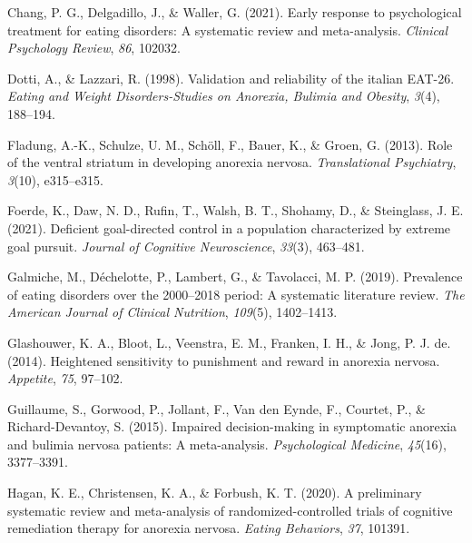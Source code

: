 \documentclass[
  man,floatsintext]{apa6}
\newlength{\cslhangindent}
\newlength{\cslentryspacingunit} %
\newenvironment{CSLReferences}[2] %
 {%
  \setlength{\parindent}{0pt}
  \ifodd #1
  \let\oldpar\par
  \def\par{\hangindent=\cslhangindent\oldpar}
  \fi
  \setlength{\parskip}{#2\cslentryspacingunit}
 }%
 {}
\begin{document}
\begin{CSLReferences}{1}{0}
\leavevmode{}%
Chang, P. G., Delgadillo, J., \& Waller, G. (2021). Early response to psychological treatment for eating disorders: A systematic review and meta-analysis. \emph{Clinical Psychology Review}, \emph{86}, 102032.

\leavevmode{}%
Dotti, A., \& Lazzari, R. (1998). Validation and reliability of the italian {EAT-26}. \emph{Eating and Weight Disorders-Studies on Anorexia, Bulimia and Obesity}, \emph{3}(4), 188--194.

\leavevmode{}%
Fladung, A.-K., Schulze, U. M., Schöll, F., Bauer, K., \& Groen, G. (2013). Role of the ventral striatum in developing anorexia nervosa. \emph{Translational Psychiatry}, \emph{3}(10), e315--e315.

\leavevmode{}%
Foerde, K., Daw, N. D., Rufin, T., Walsh, B. T., Shohamy, D., \& Steinglass, J. E. (2021). Deficient goal-directed control in a population characterized by extreme goal pursuit. \emph{Journal of Cognitive Neuroscience}, \emph{33}(3), 463--481.

\leavevmode{}%
Galmiche, M., Déchelotte, P., Lambert, G., \& Tavolacci, M. P. (2019). Prevalence of eating disorders over the 2000--2018 period: A systematic literature review. \emph{The American Journal of Clinical Nutrition}, \emph{109}(5), 1402--1413.

\leavevmode{}%
Glashouwer, K. A., Bloot, L., Veenstra, E. M., Franken, I. H., \& Jong, P. J. de. (2014). Heightened sensitivity to punishment and reward in anorexia nervosa. \emph{Appetite}, \emph{75}, 97--102.

\leavevmode{}%
Guillaume, S., Gorwood, P., Jollant, F., Van den Eynde, F., Courtet, P., \& Richard-Devantoy, S. (2015). Impaired decision-making in symptomatic anorexia and bulimia nervosa patients: A meta-analysis. \emph{Psychological Medicine}, \emph{45}(16), 3377--3391.

\leavevmode{}%
Hagan, K. E., Christensen, K. A., \& Forbush, K. T. (2020). A preliminary systematic review and meta-analysis of randomized-controlled trials of cognitive remediation therapy for anorexia nervosa. \emph{Eating Behaviors}, \emph{37}, 101391.


\end{CSLReferences}
\end{document}
